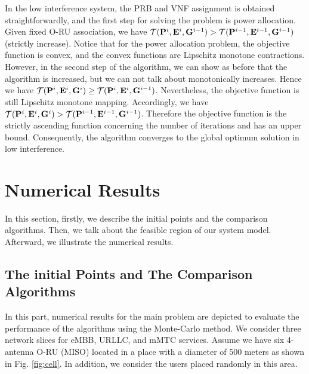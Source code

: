 \documentclass[lettersize,journal]{IEEEtran}
\begin{document}
In the low interference system, the PRB and VNF assignment is obtained straightforwardly, and the first step for solving the problem is power allocation. Given fixed O-RU association, we have
$\mathcal{T}(\bold{P}^{i},\bold{E}^i,\bold{G}^{i-1}) > \mathcal{T}(\bold{P}^{i-1},\bold{E}^{i-1},\bold{G}^{i-1})$ (strictly increase). 
Notice that for the power allocation problem, the objective function is convex, and the convex functions are Lipschitz monotone contractions. 
However, in the second step of the algorithm, we can show as before that the algorithm is increased, but we can not talk about monotonically increases.
Hence we have
$\mathcal{T}(\bold{P}^{i},\bold{E}^i,\bold{G}^{i}) \geq \mathcal{T}(\bold{P}^{i},\bold{E}^{i},\bold{G}^{i-1})$.
Nevertheless, the objective function is still Lipschitz monotone mapping. 
Accordingly, we have 
$\mathcal{T}(\bold{P}^{i},\bold{E}^i,\bold{G}^{i}) > \mathcal{T}(\bold{P}^{i-1},\bold{E}^{i-1},\bold{G}^{i-1})$.
Therefore the objective function is the strictly ascending
function concerning the number of iterations and has an
upper bound.
Consequently, the algorithm converges to the 
global optimum solution in low interference.
\section{Numerical Results}\label{NE}
In this section, firstly, we describe the initial points and the comparison algorithms.
Then, we talk about the feasible region of our system model. Afterward, we illustrate the numerical results.
\vspace{-3mm}
\subsection{The initial Points and The Comparison Algorithms}
\vspace{-1mm}
In this part, numerical results for the main problem are depicted to evaluate the performance of the algorithms using the Monte-Carlo method. We consider three network slices for eMBB, URLLC, and mMTC services.
Assume we have six 4-antenna O-RU (MISO) located in a place with a diameter of 500 meters as shown in Fig. \ref{fig:cell}. In addition, we consider the users placed randomly in this area.
\end{document}
